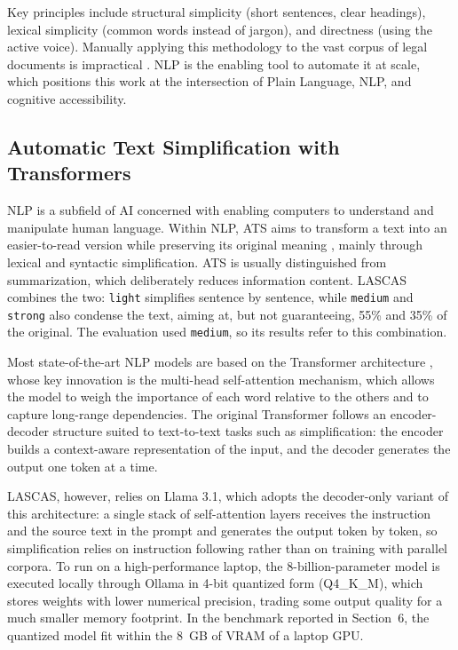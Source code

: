 \documentclass[english]{UNISINOSartigo} %
\begin{document}
Key principles include structural simplicity (short sentences, clear headings), lexical simplicity (common words instead of jargon), and directness (using the active voice). Manually applying this methodology to the vast corpus of legal documents is impractical \cite{alves2023automatic}. NLP is the enabling tool to automate it at scale, which positions this work at the intersection of Plain Language, NLP, and cognitive accessibility.

\subsection{Automatic Text Simplification with Transformers}

NLP is a subfield of AI concerned with enabling computers to understand and manipulate human language. Within NLP, ATS aims to transform a text into an easier-to-read version while preserving its original meaning \cite{alves2023automatic}, mainly through lexical and syntactic simplification. ATS is usually distinguished from summarization, which deliberately reduces information content. LASCAS combines the two: \texttt{light} simplifies sentence by sentence, while \texttt{medium} and \texttt{strong} also condense the text, aiming at, but not guaranteeing, 55\% and 35\% of the original. The evaluation used \texttt{medium}, so its results refer to this combination.

Most state-of-the-art NLP models are based on the Transformer architecture \cite{alissa2023text}, whose key innovation is the multi-head self-attention mechanism, which allows the model to weigh the importance of each word relative to the others and to capture long-range dependencies. The original Transformer \cite{vaswani2017attention} follows an encoder-decoder structure suited to text-to-text tasks such as simplification: the encoder builds a context-aware representation of the input, and the decoder generates the output one token at a time.

LASCAS, however, relies on Llama 3.1, which adopts the decoder-only variant of this architecture: a single stack of self-attention layers receives the instruction and the source text in the prompt and generates the output token by token, so simplification relies on instruction following rather than on training with parallel corpora. To run on a high-performance laptop, the 8-billion-parameter model is executed locally through Ollama in 4-bit quantized form (Q4\_K\_M), which stores weights with lower numerical precision, trading some output quality for a much smaller memory footprint. In the benchmark reported in Section~6, the quantized model fit within the 8~GB of VRAM of a laptop GPU.
\end{document}
